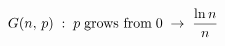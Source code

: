 \documentclass[preview]{standalone}
\begin{document}
\begin{align*}
\special{dvisvgm:raw <g id='unique000'>}G(n,\,p)\;:\;p\;\text{grows from}\;0\;\to\;\frac{\ln n}{n}\special{dvisvgm:raw </g>}
\end{align*}
\end{document}
